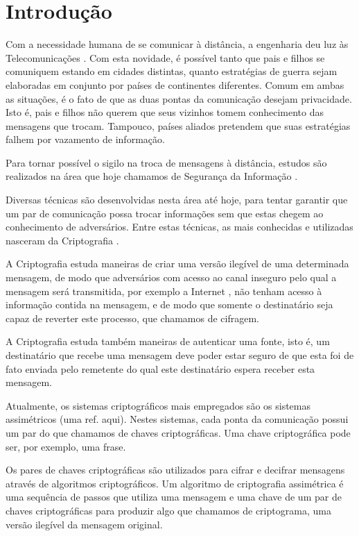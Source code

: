 \chapter{Introdução}

Com a necessidade humana de se comunicar à distância, a engenharia deu luz às
Telecomunicações \cite{telecommunications}. Com esta novidade, é possível tanto
que pais e filhos se comuniquem estando em cidades distintas, quanto estratégias
de guerra sejam elaboradas em conjunto por países de continentes
diferentes. Comum em ambas as situações, é o fato de que as duas pontas da
comunicação desejam privacidade. Isto é, pais e filhos não querem que seus
vizinhos tomem conhecimento das mensagens que trocam. Tampouco, países aliados
pretendem que suas estratégias falhem por vazamento de informação.

Para tornar possível o sigilo na troca de mensagens à distância, estudos são
realizados na área que hoje chamamos de Segurança da Informação
\cite{information_security}.

Diversas técnicas são desenvolvidas nesta área até hoje, para tentar garantir
que um par de comunicação possa trocar informações sem que estas chegem ao
conhecimento de adversários. Entre estas técnicas, as mais conhecidas e
utilizadas nasceram da Criptografia \cite{cryptography}.

A Criptografia estuda maneiras de criar uma versão ilegível de uma determinada
mensagem, de modo que adversários com acesso ao canal inseguro pelo qual a
mensagem será transmitida, por exemplo a Internet \cite{internet}, não tenham
acesso à informação contida na mensagem, e de modo que somente o destinatário
seja capaz de reverter este processo, que chamamos de cifragem.

A Criptografia estuda também maneiras de autenticar uma fonte, isto é, um
destinatário que recebe uma mensagem deve poder estar seguro de que esta foi de
fato enviada pelo remetente do qual este destinatário espera receber esta
mensagem.

Atualmente, os sistemas criptográficos mais empregados são os sistemas
assimétricos (uma ref. aqui). Nestes sistemas, cada ponta da comunicação possui
um par do que chamamos de chaves criptográficas. Uma chave criptográfica pode
ser, por exemplo, uma frase.

Os pares de chaves criptográficas são utilizados para cifrar e decifrar
mensagens através de algoritmos criptográficos. Um algoritmo de criptografia
assimétrica é uma sequência de passos que utiliza uma mensagem e uma chave de um
par de chaves criptográficas para produzir algo que chamamos de criptograma, uma
versão ilegível da mensagem original.

